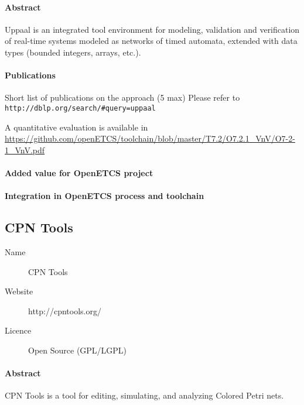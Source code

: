 \paragraph{Abstract} Uppaal is an integrated tool environment for modeling, validation and verification of real-time systems modeled as networks of timed automata, extended with data types (bounded integers, arrays, etc.).

\paragraph{Publications} Short list of publications on the approach (5 max)
Please refer to \verb|http://dblp.org/search/#query=uppaal|



A quantitative evaluation is available in \url{https://github.com/openETCS/toolchain/blob/master/T7.2/O7.2.1_VnV/O7-2-1_VnV.pdf}


\paragraph{Added value for OpenETCS project}

\begin{comment}
To complete: Stefan Rieger  ?
\end{comment}


\paragraph{Integration in OpenETCS process and toolchain}

\begin{comment}
To complete: Stefan Rieger  ?
\end{comment}


\subsection{CPN Tools}

\begin{description}
\item[Name] CPN Tools
\item[Website] http://cpntools.org/
\item[Licence] Open Source (GPL/LGPL)
\end{description}

\paragraph{Abstract} CPN Tools is a tool for editing, simulating, and analyzing Colored Petri nets.

